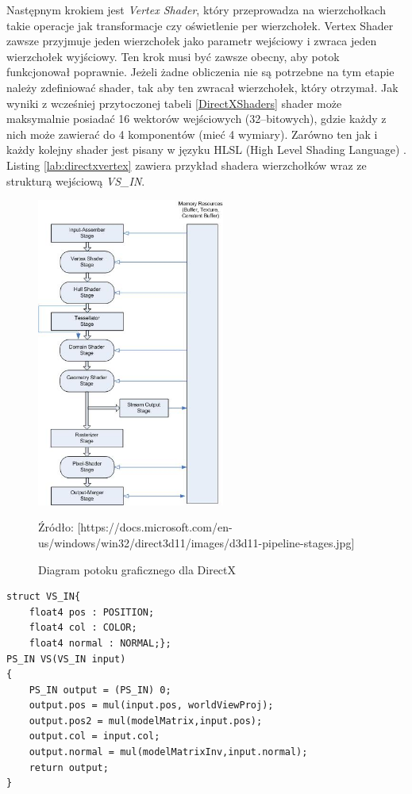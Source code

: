 \documentclass[archive]{mgr}
\begin{document}
Następnym krokiem jest \emph{Vertex Shader}, który przeprowadza na wierzchołkach takie operacje jak transformacje czy oświetlenie per wierzchołek. Vertex Shader zawsze przyjmuje jeden wierzchołek jako parametr wejściowy i zwraca jeden wierzchołek wyjściowy. Ten krok musi być zawsze obecny, aby potok funkcjonował poprawnie. Jeżeli żadne obliczenia nie są potrzebne na tym etapie należy zdefiniować shader, tak aby ten zwracał wierzchołek, który otrzymał. Jak wyniki z wcześniej przytoczonej tabeli \ref{DirectXShaders} shader może maksymalnie posiadać 16 wektorów wejściowych (32–bitowych), gdzie każdy z nich może zawierać do 4 komponentów (mieć 4 wymiary). Zarówno ten jak i każdy kolejny shader jest pisany w języku HLSL (High Level Shading Language) \cite{directxHLSL}. Listing \ref{lab:directxvertex} zawiera przykład shadera wierzchołków wraz ze strukturą wejściową \emph{VS\_IN}. 

\newpage
\begin{figure}[h!]
  \centering
    \includegraphics[width=0.55\textwidth]{images/directxpipeline.jpg}
   \caption{Diagram potoku graficznego dla DirectX}
   Źródło: [https://docs.microsoft.com/en-us/windows/win32/direct3d11/images/d3d11-pipeline-stages.jpg]
   \label{lab:directxpipeline}
\end{figure}

\begin{lstlisting}[caption={DirectX, Vertex Shader},captionpos=b,label={lab:directxvertex}]
struct VS_IN{
	float4 pos : POSITION;
	float4 col : COLOR;
	float4 normal : NORMAL;};
PS_IN VS(VS_IN input)
{
	PS_IN output = (PS_IN) 0;
	output.pos = mul(input.pos, worldViewProj);
	output.pos2 = mul(modelMatrix,input.pos);
	output.col = input.col;
	output.normal = mul(modelMatrixInv,input.normal);
	return output;
} 
\end{lstlisting}
\end{document}
